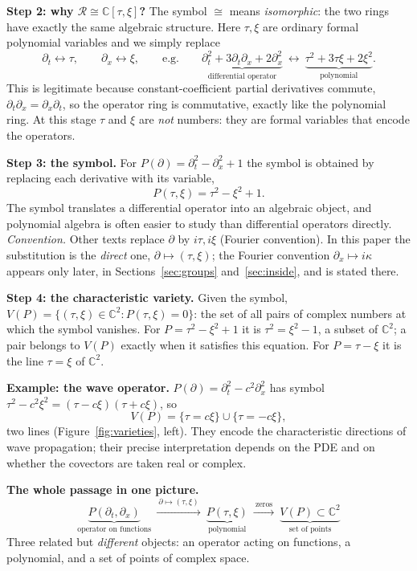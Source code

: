 \documentclass[11pt]{article}
\theoremstyle{plain}
\theoremstyle{definition}
\theoremstyle{remark}
\newcommand{\C}{\mathbb{C}}
\newcommand{\ring}{\mathcal{R}}            %
\newcommand{\Var}{V}                        %
\begin{document}
\medskip\textbf{Step 2: why $\ring\cong\C[\tau,\xi]$?} The symbol $\cong$ means \emph{isomorphic}: the two rings have exactly the same algebraic structure. Here $\tau,\xi$ are ordinary formal polynomial variables and we simply replace
\[
\partial_t\longleftrightarrow\tau,\qquad\partial_x\longleftrightarrow\xi,
\qquad\text{e.g.}\qquad
\underbrace{\partial_t^2+3\partial_t\partial_x+2\partial_x^2}_{\text{differential operator}}\ \longleftrightarrow\ \underbrace{\tau^2+3\tau\xi+2\xi^2}_{\text{polynomial}} .
\]
This is legitimate because constant-coefficient partial derivatives commute, $\partial_t\partial_x=\partial_x\partial_t$, so the operator ring is commutative, exactly like the polynomial ring. At this stage $\tau$ and $\xi$ are \emph{not} numbers: they are formal variables that encode the operators.

\medskip\textbf{Step 3: the symbol.} For $P(\partial)=\partial_t^2-\partial_x^2+1$ the symbol is obtained by replacing each derivative with its variable,
\[
P(\tau,\xi)=\tau^2-\xi^2+1 .
\]
The symbol translates a differential operator into an algebraic object, and polynomial algebra is often easier to study than differential operators directly. \emph{Convention.} Other texts replace $\partial$ by $i\tau,i\xi$ (Fourier convention). In this paper the substitution is the \emph{direct} one, $\partial\mapsto(\tau,\xi)$; the Fourier convention $\partial_x\mapsto i\kappa$ appears only later, in Sections~\ref{sec:groups} and~\ref{sec:inside}, and is stated there.

\medskip\textbf{Step 4: the characteristic variety.} Given the symbol, $\Var(P)=\{(\tau,\xi)\in\C^2:P(\tau,\xi)=0\}$: the set of all pairs of complex numbers at which the symbol vanishes. For $P=\tau^2-\xi^2+1$ it is $\tau^2=\xi^2-1$, a subset of $\C^2$; a pair belongs to $\Var(P)$ exactly when it satisfies this equation. For $P=\tau-\xi$ it is the line $\tau=\xi$ of $\C^2$.

\medskip\textbf{Example: the wave operator.} $P(\partial)=\partial_t^2-c^2\partial_x^2$ has symbol $\tau^2-c^2\xi^2=(\tau-c\xi)(\tau+c\xi)$, so
\[
\Var(P)=\{\tau=c\xi\}\cup\{\tau=-c\xi\},
\]
two lines (Figure~\ref{fig:varieties}, left). They encode the characteristic directions of wave propagation; their precise interpretation depends on the PDE and on whether the covectors are taken real or complex.

\medskip\textbf{The whole passage in one picture.}
\[
\underbrace{P(\partial_t,\partial_x)}_{\text{operator on functions}}\ \xrightarrow{\ \partial\mapsto(\tau,\xi)\ }\ \underbrace{P(\tau,\xi)}_{\text{polynomial}}\ \xrightarrow{\ \text{zeros}\ }\ \underbrace{\Var(P)\subset\C^2}_{\text{set of points}}
\]
Three related but \emph{different} objects: an operator acting on functions, a polynomial, and a set of points of complex space.
\end{document}
